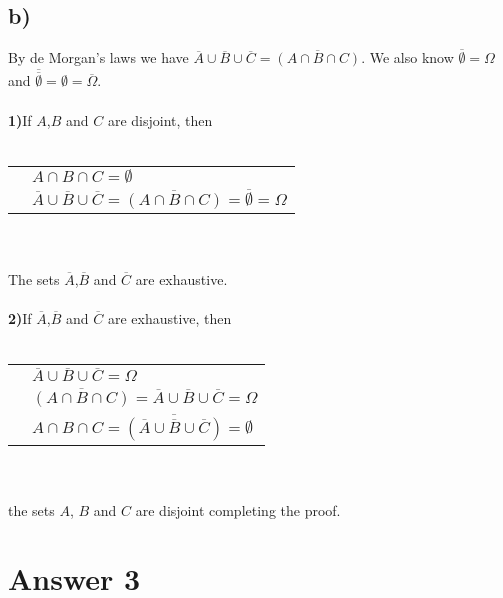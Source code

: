 \documentclass[12pt]{article}
\begin{document}
\subsection*{b)}
By de Morgan's laws we have $\overline{A} \cup \overline{B} \cup \overline{C} = \overline{(A \cap B \cap C)}$.
We also know $\overline{\emptyset}=\Omega$ and $\overline{\overline{\emptyset}}=\emptyset=\overline{\Omega}$.
\\ \\
\textbf{1)}If $A$,$B$ and $C$ are disjoint, then
\\ \\
\begin{tabular}{l l}
    &$A \cap B \cap C = \emptyset$\\
    &$\overline{A} \cup \overline{B} \cup \overline{C} = \overline{(A \cap B \cap C)} = \overline{\emptyset}=\Omega$\\
\end{tabular}
\\ \\
The sets $\overline{A}$,$\overline{B}$ and $\overline{C}$ are exhaustive.
\\ \\
\textbf{2)}If $\overline{A}$,$\overline{B}$ and $\overline{C}$ are exhaustive, then
\\ \\
\begin{tabular}{l l}
    &$\overline{A} \cup \overline{B} \cup \overline{C}= \Omega$\\
    &$\overline{(A \cap B \cap C)}=\overline{A} \cup \overline{B} \cup \overline{C} = \Omega$\\
    &$A \cap B \cap C = \overline{(\overline{A} \cup \overline{B} \cup \overline{C})} = \emptyset$\\
\end{tabular}
\\ \\
the sets $A$, $B$ and $C$ are disjoint completing the proof.
\section*{Answer 3}
\end{document}
